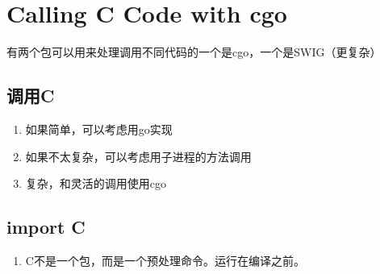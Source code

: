 \begin{Shaded}
\begin{Highlighting}[]
\NormalTok{ \{}
\NormalTok{\}}


\end{Highlighting}
\end{Shaded}

\hypertarget{calling-c-code-with-cgo}{%
\section{Calling C Code with cgo}\label{calling-c-code-with-cgo}}

有两个包可以用来处理调用不同代码的一个是cgo，一个是SWIG（更复杂）

\hypertarget{ux8c03ux7528c}{%
\subsection{调用C}\label{ux8c03ux7528c}}

\begin{enumerate}
\tightlist
\item
  如果简单，可以考虑用go实现
\item
  如果不太复杂，可以考虑用子进程的方法调用
\item
  复杂，和灵活的调用使用cgo
\end{enumerate}

\hypertarget{import-c}{%
\subsection{import C}\label{import-c}}

\begin{enumerate}
\tightlist
\item
  C不是一个包，而是一个预处理命令。运行在编译之前。
\end{enumerate}

